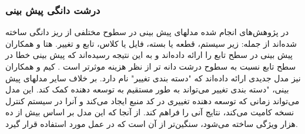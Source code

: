 \subsubsection{درشت دانگی پیش بینی }
در پژوهش‌های انجام شده مدلهای پیش بینی در سطوح مختلفی از ریز دانگی ساخته شده‌اند از جمله: زیر سیستم، قطعه یا بسته، فایل یا کلاس، تابع و تغییر. هتا و همکاران  پیش بینی در سطح تابع را ارائه داده‌اند و به این نتیجه رسیده‌اند که پیش بینی خطا در سطح تابع نسبت به سطوح درشت دانه تر از نظر هزینه موثرتر است \cite{hata2012bug}. کیم و همکاران نیز مدل جدیدی ارائه داده‌اند که "دسته بندی تغییر"  نام دارد. بر خلاف سایر مدلهای پیش بینی، "دسته بندی تغییر می‌تواند به طور مستقیم به توسعه دهنده کمک کند. این مدل می‌تواند زمانی که توسعه دهنده تغییری در کد منبع ایجاد می‌کند و آنرا در سیستم کنترل نسخه کامیت می‌کند، نتایج آنی را فراهم کند.  از آنجا که این مدل بر اساس بیش از ده هزار ویژگی ساخته می‌شود، سنگین‌تر از آن است که در عمل مورد استفاده قرار گیرد\cite{kim2008classifying}. \\


